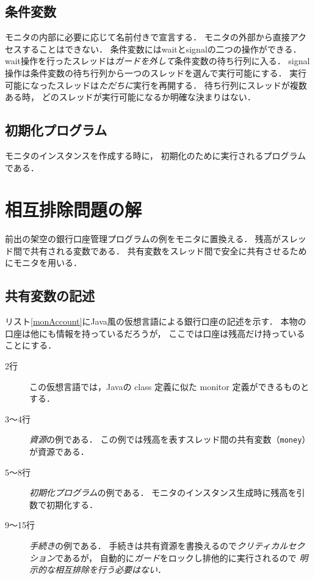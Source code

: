 \subsection{条件変数}
モニタの内部に必要に応じて名前付きで宣言する．
モニタの外部から直接アクセスすることはできない．
条件変数にはwaitとsignalの二つの操作ができる．
wait操作を行ったスレッドは\emph{ガードを外して}条件変数の待ち行列に入る．
signal操作は条件変数の待ち行列から一つのスレッドを選んで実行可能にする．
実行可能になったスレッドは\emph{ただちに}実行を再開する．
待ち行列にスレッドが複数ある時，
どのスレッドが実行可能になるか明確な決まりはない．

\subsection{初期化プログラム}
モニタのインスタンスを作成する時に，
初期化のために実行されるプログラムである．

\section{相互排除問題の解}
前出の架空の銀行口座管理プログラムの例をモニタに置換える．
残高がスレッド間で共有される変数である．
共有変数をスレッド間で安全に共有させるためにモニタを用いる．

\subsection{共有変数の記述}
リスト\ref{monAccount}にJava風の仮想言語による銀行口座の記述を示す．
本物の口座は他にも情報を持っているだろうが，
ここでは口座は残高だけ持っていることにする．



\begin{description}
\item [2行]
  この仮想言語では，Javaの class 定義に似た monitor 定義ができるものとする．
\item [3〜4行]
  \emph{資源}の例である．
  この例では残高を表すスレッド間の共有変数（\texttt{money}）が資源である．
\item [5〜8行]
  \emph{初期化プログラム}の例である．
  モニタのインスタンス生成時に残高を引数で初期化する．
\item [9〜15行]
  \emph{手続き}の例である．
  手続きは共有資源を書換えるので\emph{クリティカルセクション}であるが，
  自動的に\emph{ガード}をロックし排他的に実行されるので
  \emph{明示的な相互排除を行う必要はない}．
\end{description}

